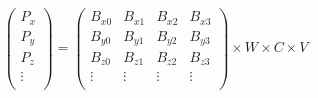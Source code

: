 \begin{equation*}
    \left(
    \begin{array}{cccc}
        P_x    \\
        P_y    \\
        P_z    \\
        \vdots \\
    \end{array}
    \right)
    =
    \left(
    \begin{array}{cccc}
        B_{x0} & B_{x1} & B_{x2} & B_{x3} \\
        B_{y0} & B_{y1} & B_{y2} & B_{y3} \\
        B_{z0} & B_{z1} & B_{z2} & B_{z3} \\
        \vdots & \vdots & \vdots & \vdots \\
    \end{array}
    \right)
    \times
    W
    \times
    C
    \times
    V
\end{equation*}